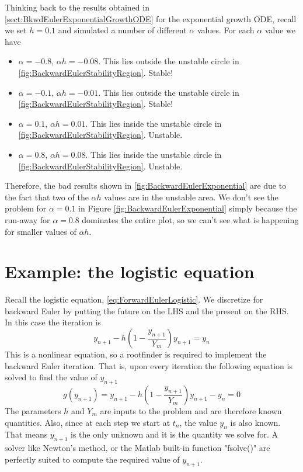\documentclass[hidelinks,notitlepage]{book}
\begin{document}
Thinking back to the results obtained in \cref{sect:BkwdEulerExponentialGrowthODE} for the exponential growth ODE, recall we set $h = 0.1$ and simulated a number of different $\alpha$ values.  For each $\alpha$ value we have
\begin{itemize}
	\item $\alpha = -0.8$, $\alpha h = -0.08$.  This lies outside the unstable circle in \cref{fig:BackwardEulerStabilityRegion}.  Stable!
	\item $\alpha = -0.1$, $\alpha h = -0.01$.  This lies outside the unstable circle in \cref{fig:BackwardEulerStabilityRegion}.  Stable!
	\item $\alpha = 0.1$, $\alpha h = 0.01$.  This lies inside the unstable circle in \cref{fig:BackwardEulerStabilityRegion}.  Unstable.
	\item $\alpha = 0.8$, $\alpha h = 0.08$.  This lies inside the unstable circle in \cref{fig:BackwardEulerStabilityRegion}.  Unstable.
\end{itemize}
Therefore, the bad results shown in \cref{fig:BackwardEulerExponential} are due to the fact that two of the $\alpha h$ values are in the unstable area.  We don't see the problem for $\alpha = 0.1$ in Figure \cref{fig:BackwardEulerExponential} simply because the run-away for $\alpha = 0.8$ dominates the entire plot, so we can't see what is happening for smaller values of $\alpha h$.


\section{Example: the logistic equation}
Recall the logistic equation, \cref{eq:ForwardEulerLogistic}.  
We discretize for backward Euler by putting the future on the LHS and the present on the RHS.  In this case the iteration is 
\begin{equation}
\nonumber
y_{n+1} - h \left( 1 - \frac{y_{n+1}}{Y_m} \right)y_{n+1} = y_n
\end{equation}
This is a nonlinear equation, so a rootfinder is required to implement the backward Euler iteration.  That is, upon every iteration the following equation is solved to find the value of $y_{n+1}$
\begin{equation}
\nonumber
g(y_{n+1}) = y_{n+1} - h \left( 1 - \frac{y_{n+1}}{Y_m} \right)y_{n+1} - y_n = 0
\end{equation}
The parameters $h$ and $Y_m$ are inputs to the problem and are therefore known quantities.  Also, since at each step we start at $t_n$, the value $y_n$ is also known.  That means $y_{n+1}$ is the only unknown and it is the quantity we solve for.  A solver like Newton's method, or the Matlab built-in function "fsolve()" are perfectly suited to compute the required value of $y_{n+1}$.
\end{document}
